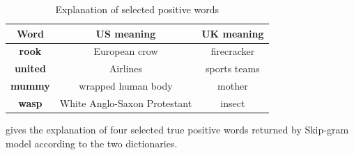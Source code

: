 \begin{table}
\small
\begin{tabular}{|c|c|c|}
\hline
Word & US meaning & UK meaning\\ \hline
\hline
{\bf rook} & European crow & firecracker \\
\hline
{\bf united} & Airlines & sports teams \\
\hline
{\bf mummy} & wrapped human body & mother \\
\hline
{\bf wasp} & White Anglo-Saxon Protestant & insect \\
\hline
\end{tabular}
\caption{Explanation of selected positive words}
\label{tab:explain}
\end{table}

 gives the explanation of four selected true positive
words returned by Skip-gram model according to the two dictionaries.


